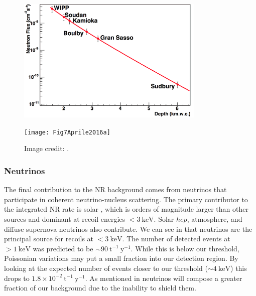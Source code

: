 {\begin{figure}
\centering
\includegraphics[width=0.8\textwidth]{MuonFluxOverDepth}
\label{fig:backgrounds_nuclear_muon_induced_flux}
\end{figure}

\begin{figure}
\centering
\texttt{[image: Fig7Aprile2016a]}
\caption{Image credit: .}
\label{fig:backgrounds_nuclear_muon_induced_nr_rate}
\end{figure}



\subsubsection{Neutrinos}
\label{subsubsec:backgrounds_nuclear_neutrinos}
The final contribution to the NR background comes from neutrinos that participate in coherent neutrino-nucleus scattering.  The primary
contributor to the integrated NR rate is solar , which is orders of magnitude larger than other sources and dominant at
recoil energies $< 3\ \mathrm{keV}$.  Solar $hep$, atmosphere, and diffuse supernova neutrinos also contribute.  We can see in
 that neutrinos are the principal source for recoils at $< 3\ \mathrm{keV}$.  The
number of detected events at $> 1\ \mathrm{keV}$ was predicted to be ${\sim} 90\ \mathrm{t^{-1}\ y^{-1}}$.  While this is below our
threshold, Poissonian variations may put a small fraction into our detection region.  By looking at the expected number of events closer
to our threshold (${\sim} 4\ \mathrm{keV}$) this drops to $1.8 \times 10^{-2}\ \mathrm{t^{-1}\ y^{-1}}$.  As mentioned in
 neutrinos will compose a greater fraction of our background due to the inability
to shield them.



}
